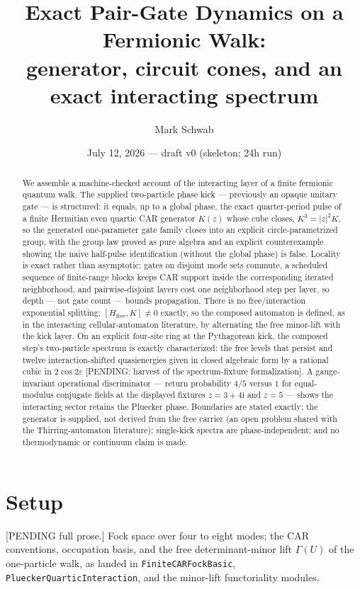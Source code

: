\documentclass[11pt]{article}
\title{Exact Pair-Gate Dynamics on a Fermionic Walk:\\
generator, circuit cones, and an exact interacting spectrum}
\author{Mark Schwab}
\date{July 12, 2026 --- draft v0 (skeleton; 24h run)}
\newcommand{\ii}{\mathrm{i}}
\begin{document}
\maketitle

\begin{abstract}
We assemble a machine-checked account of the interacting layer of a
finite fermionic quantum walk.  The supplied two-particle phase kick ---
previously an opaque unitary gate --- is structured: it equals, up to a
global phase, the exact quarter-period pulse of a finite Hermitian even
quartic CAR generator $K(z)$ whose cube closes, $K^3=|z|^2K$, so the
generated one-parameter gate family closes into an explicit
circle-parametrized group, with the group law proved as pure algebra and an explicit
counterexample showing the naive half-pulse identification (without the
global phase) is false.  Locality is exact rather than asymptotic:
gates on disjoint mode sets commute, a scheduled sequence of finite-range
blocks keeps CAR support inside the corresponding iterated neighborhood,
and pairwise-disjoint layers cost one neighborhood step per layer, so
depth --- not gate count --- bounds propagation.  There is no
free/interaction exponential splitting: $[H_{\mathrm{free}},K]\neq0$
exactly, so the composed automaton is defined, as in the interacting
cellular-automaton literature, by alternating the free minor-lift with
the kick layer.  On an explicit four-site ring at the Pythagorean kick,
the composed step's two-particle spectrum is exactly characterized:
the free levels that persist and twelve interaction-shifted quasienergies
given in closed algebraic form by a rational cubic in $2\cos2\varepsilon$
[PENDING: harvest of the spectrum-fixture formalization].  A
gauge-invariant operational discriminator --- return probability $4/5$
versus $1$ for equal-modulus conjugate fields at the displayed fixtures
$z=3+4\ii$ and $z=5$ --- shows the interacting
sector retains the Pluecker phase.  Boundaries are stated exactly: the
generator is supplied, not derived from the free carrier (an open
problem shared with the Thirring-automaton literature); single-kick
spectra are phase-independent; and no thermodynamic or continuum claim
is made.
\end{abstract}

\section{Setup}
[PENDING full prose.]  Fock space over four to eight modes; the CAR
conventions, occupation basis, and the free determinant-minor lift
$\Gamma(U)$ of the one-particle walk, as landed in
\texttt{FiniteCARFockBasic}, \texttt{PlueckerQuarticInteraction}, and the
minor-lift functoriality modules.
\end{document}
